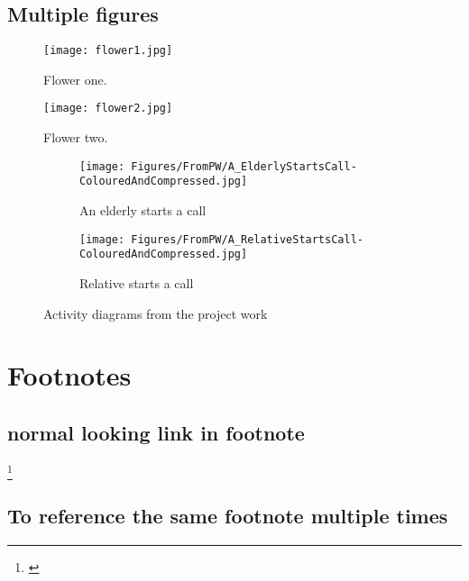 \subsection{Multiple figures}

\begin{figure}[!tbp]
  \centering
  \begin{minipage}[b]{0.4\textwidth}
    \texttt{[image: flower1.jpg]}
    \caption{Flower one.}
  \end{minipage}
  \hfill
  \begin{minipage}[b]{0.4\textwidth}
    \texttt{[image: flower2.jpg]}
    \caption{Flower two.}
  \end{minipage}
\end{figure}

\begin{figure}[H]
\centering
    \hspace*{\fill}%
    \begin{subfigure}[b]{0.525\textwidth}
            \texttt{[image: Figures/FromPW/A\_ElderlyStartsCall-ColouredAndCompressed.jpg]}
            \caption{An elderly starts a  call}
            \label{fig:A_ElderlyStartsCall}
    \end{subfigure}%
    \hfill
    \begin{subfigure}[b]{0.455\textwidth}
            \centering
            \texttt{[image: Figures/FromPW/A\_RelativeStartsCall-ColouredAndCompressed.jpg]}
            \caption{Relative starts a  call}
            \label{fig:A_RelativeStartsCall}
    \end{subfigure}
    \hspace*{\fill}%
    \caption{Activity diagrams from the project work \cite{projectwork}}
    \label{fig:Activites-from-PW}
\end{figure}

\section{Footnotes}

\subsection{normal looking link in footnote}

\footnote
    {\href{}
    {}}

\subsection{To reference the same footnote multiple times}

